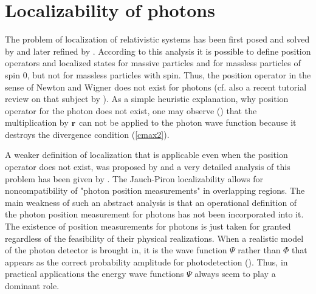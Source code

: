 \documentclass[11pt]{article}
\begin{document}
\section{Localizability of photons\label{localizability}}

The problem of localization of relativistic systems has been first posed and
solved by \cite{NW_49} and later refined by \cite{Wightman_62}. According to
this analysis it is possible to define position operators and localized
states for massive particles and for massless particles of spin 0, but not
for massless particles with spin. Thus, the position operator in the sense
of Newton and Wigner does not exist for photons (cf. also a recent tutorial
review on that subject by \cite{RS_92}). As a simple heuristic explanation,
why position operator for the photon does not exist, one may observe
(\cite{Pryce_48}) that the multiplication by ${\bf r}$ can not be applied to
the photon wave function because it destroys the divergence condition
(\ref{cmax2}).

A weaker definition of localization that is applicable even when the
position operator does not exist, was proposed by \cite{JP_67} and a very
detailed analysis of this problem has been given by \cite{Amrein_69}. The
Jauch-Piron localizability allows for noncompatibility of "photon position
measurements" in overlapping regions. The main weakness of such an abstract
analysis is that an operational definition of the photon position
measurement for photons has not been incorporated into it. The existence of
position measurements for photons is just taken for granted regardless of
the feasibility of their physical realizations. When a realistic model of
the photon detector is brought in, it is the wave function $\Psi$ rather
than $\Phi$ that appears as the correct probability amplitude for
photodetection (\cite{MW_95}). Thus, in practical applications the energy
wave functions $\Psi$ always seem to play a dominant role.
\end{document}
